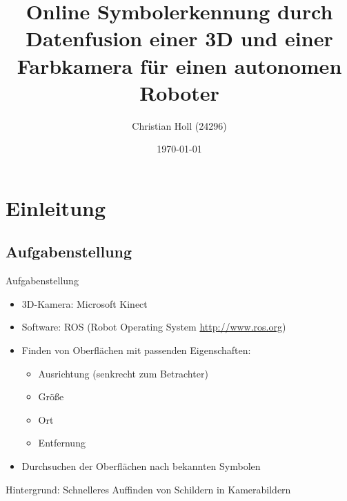 \documentclass{VLKlauck}
\author[]{Christian Holl (24296)}
\institute[HTW Aaalen - Elektronik und Informatik]
{
	Studiengang Computer Controlled Systems\\
	Hochschule Aalen - Technik und Wirtschaft
}
\title[]{Online Symbolerkennung durch Datenfusion einer 3D und einer Farbkamera für einen autonomen Roboter}
\date[]{\today}
\begin{document}
\maketitle

  \section{Einleitung}
  \subsection{Aufgabenstellung}
	\begin{frame}{Aufgabenstellung}   
		\begin{itemize}
		  \item 3D-Kamera: Microsoft Kinect
		  \item Software: ROS (Robot Operating System \url{http://www.ros.org})
		  \item Finden von Oberflächen mit passenden Eigenschaften:
		 	 \begin{itemize}
		    	\item Ausrichtung (senkrecht zum Betrachter) 
		    	\item Größe 
		    	\item Ort
		    	\item Entfernung   
			\end{itemize}
		  \item Durchsuchen der Oberflächen nach bekannten Symbolen
		\end{itemize}
		Hintergrund: Schnelleres Auffinden von Schildern in Kamerabildern
	\end{frame} 
\end{document}
